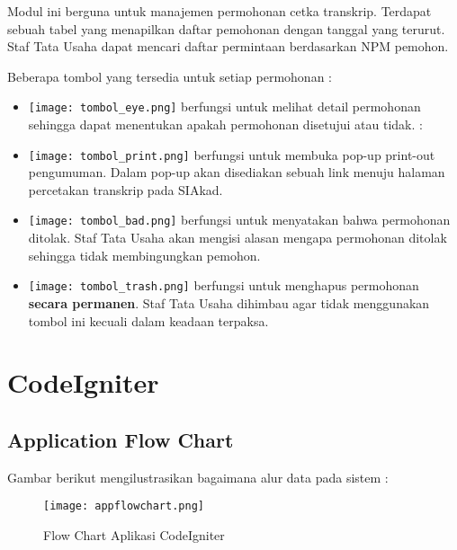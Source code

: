 Modul ini berguna untuk manajemen permohonan cetka transkrip. Terdapat sebuah tabel yang menapilkan daftar pemohonan dengan tanggal yang terurut. Staf Tata Usaha dapat mencari daftar permintaan berdasarkan NPM pemohon.

Beberapa tombol yang tersedia untuk setiap permohonan :

\begin{itemize}
\item \texttt{[image: tombol\_eye.png]} berfungsi untuk melihat detail permohonan sehingga dapat menentukan apakah permohonan disetujui atau tidak.
: \item \texttt{[image: tombol\_print.png]} berfungsi untuk membuka pop-up print-out pengumuman. Dalam pop-up akan disediakan sebuah link menuju halaman percetakan transkrip pada SIAkad.
\item \texttt{[image: tombol\_bad.png]} berfungsi untuk menyatakan bahwa permohonan ditolak. Staf Tata Usaha akan mengisi alasan mengapa permohonan ditolak sehingga tidak membingungkan pemohon.
\item \texttt{[image: tombol\_trash.png]} berfungsi untuk menghapus permohonan \textbf{secara permanen}. Staf Tata Usaha dihimbau agar tidak menggunakan tombol ini kecuali dalam keadaan terpaksa.
\end{itemize}  

\section{CodeIgniter}

\subsection{Application Flow Chart}
Gambar berikut mengilustrasikan bagaimana alur data pada sistem :

\begin{figure} [H]
	\centering  
	\texttt{[image: appflowchart.png]}  
	\caption{Flow Chart Aplikasi CodeIgniter}
	\label{fig:flow-chart-CodeIgniter} 
\end{figure}

